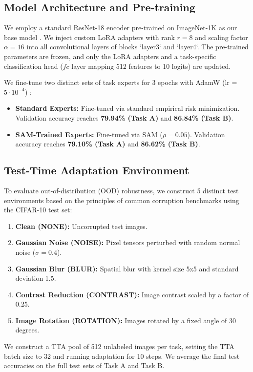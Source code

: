 \documentclass{article}
\theoremstyle{plain}
\theoremstyle{definition}
\theoremstyle{remark}
\begin{document}
\subsection{Model Architecture and Pre-training}
We employ a standard ResNet-18 encoder pre-trained on ImageNet-1K as our base model \cite{he2016deep}. We inject custom LoRA adapters with rank $r=8$ and scaling factor $\alpha=16$ into all convolutional layers of blocks `layer3` and `layer4`. The pre-trained parameters are frozen, and only the LoRA adapters and a task-specific classification head ($fc$ layer mapping 512 features to 10 logits) are updated. 

We fine-tune two distinct sets of task experts for 3 epochs with AdamW (lr = $5 \cdot 10^{-4}$) \cite{loshchilov2019decoupled}:
\begin{itemize}
    \item \textbf{Standard Experts:} Fine-tuned via standard empirical risk minimization. Validation accuracy reaches \textbf{79.94\% (Task A)} and \textbf{86.84\% (Task B)}.
    \item \textbf{SAM-Trained Experts:} Fine-tuned via SAM ($\rho=0.05$). Validation accuracy reaches \textbf{79.10\% (Task A)} and \textbf{86.62\% (Task B)}.
\end{itemize}

\subsection{Test-Time Adaptation Environment}
To evaluate out-of-distribution (OOD) robustness, we construct 5 distinct test environments based on the principles of common corruption benchmarks \cite{hendrycks2019benchmarking} using the CIFAR-10 test set:
\begin{enumerate}
    \item \textbf{Clean (NONE):} Uncorrupted test images.
    \item \textbf{Gaussian Noise (NOISE):} Pixel tensors perturbed with random normal noise ($\sigma = 0.4$).
    \item \textbf{Gaussian Blur (BLUR):} Spatial blur with kernel size 5x5 and standard deviation 1.5.
    \item \textbf{Contrast Reduction (CONTRAST):} Image contrast scaled by a factor of 0.25.
    \item \textbf{Image Rotation (ROTATION):} Images rotated by a fixed angle of 30 degrees.
\end{enumerate}
We construct a TTA pool of 512 unlabeled images per task, setting the TTA batch size to 32 and running adaptation for 10 steps. We average the final test accuracies on the full test sets of Task A and Task B.
\end{document}
